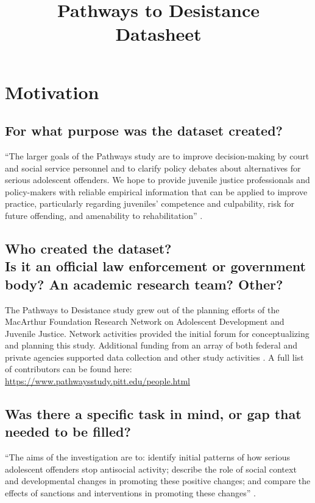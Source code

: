 \documentclass[letterpaper, 10 pt, conference]{ieeeconf}  %
\title{\LARGE \bf
Pathways to Desistance \\{\color{blue}Datasheet}
}
\newcommand{\subtitle}[1]{{\\ \small \normalfont \color{purple} #1}}
\begin{document}
\maketitle
\thispagestyle{empty}
\pagestyle{empty}

\section{Motivation}

\subsection{For what purpose was the dataset created?}

``The larger goals of the Pathways study are to improve decision-making by court and social service personnel and to clarify policy debates about alternatives for serious adolescent offenders. We hope to provide juvenile justice professionals and policy-makers with reliable empirical information that can be applied to improve practice, particularly regarding juveniles' competence and culpability, risk for future offending, and amenability to rehabilitation'' \cite{pathways_website}.

\subsection{Who created the dataset? \subtitle{Is it an official law enforcement or government body? An academic research team? Other?}}

The Pathways to Desistance study grew out of the planning efforts of the MacArthur Foundation Research Network on Adolescent Development and Juvenile Justice. Network activities provided the initial forum for conceptualizing and planning this study. Additional funding from an array of both federal and private agencies supported data collection and other study activities \cite{pathways_website}. A full list of contributors can be found here: \\
\href{https://www.pathwaysstudy.pitt.edu/people.html}{https://www.pathwaysstudy.pitt.edu/people.html}


\subsection{Was there a specific task in mind, or gap that needed to be filled?}

``The aims of the investigation are to: identify initial patterns of how serious adolescent offenders stop antisocial activity; describe the role of social context and developmental changes in promoting these positive changes; and
compare the effects of sanctions and interventions in promoting these changes'' \cite{pathways_website}.
\end{document}
